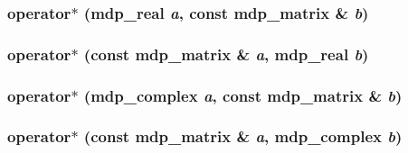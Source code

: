 \label{classmdp__matrix_a1ba8b1ac1136a436607d0f7815868508}
\hypertarget{classmdp__matrix_a0518710232891fb4bded31598cc6cd5e}{
\subsubsection[{operator$\ast$}]{ operator$\ast$ ({\bf mdp\_\-real} {\em a}, \/  const {\bf mdp\_\-matrix} \& {\em b})}}
\label{classmdp__matrix_a0518710232891fb4bded31598cc6cd5e}
\hypertarget{classmdp__matrix_a8edf780fc5b5509630fda4dba30c8b87}{
\subsubsection[{operator$\ast$}]{ operator$\ast$ (const {\bf mdp\_\-matrix} \& {\em a}, \/  {\bf mdp\_\-real} {\em b})}}
\label{classmdp__matrix_a8edf780fc5b5509630fda4dba30c8b87}
\hypertarget{classmdp__matrix_a99f6d1150215e2cb7b00de4b6aa04633}{
\subsubsection[{operator$\ast$}]{ operator$\ast$ ({\bf mdp\_\-complex} {\em a}, \/  const {\bf mdp\_\-matrix} \& {\em b})}}
\label{classmdp__matrix_a99f6d1150215e2cb7b00de4b6aa04633}
\hypertarget{classmdp__matrix_a0fc0749acc8f2a3f26f0daf14797a9e5}{
\subsubsection[{operator$\ast$}]{ operator$\ast$ (const {\bf mdp\_\-matrix} \& {\em a}, \/  {\bf mdp\_\-complex} {\em b})}}
